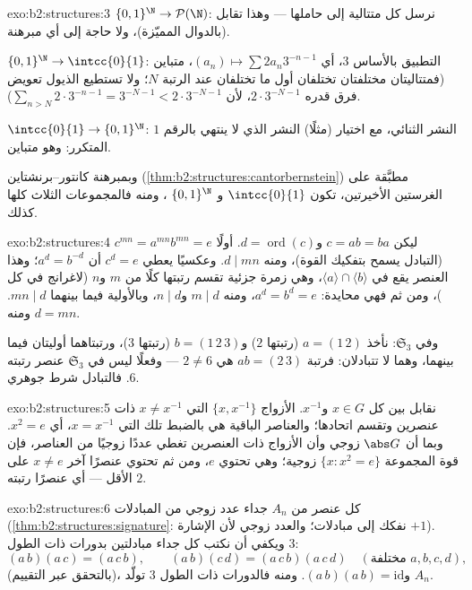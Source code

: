 \begin{solution}{exo:b2:structures:3}
$\{0,1\}^{\N} \to \mathcal{P}(\N)$: نرسل كل متتالية إلى حاملها
--- وهذا تقابل (بالدوال المميّزة)، ولا حاجة إلى أي مبرهنة.

$\{0,1\}^{\N} \to \intcc{0}{1}$: التطبيق بالأساس $3$، أي $(a_n) \mapsto
\sum 2a_n 3^{-n-1}$، متباين (فمتتاليتان مختلفتان تختلفان
أول ما تختلفان عند الرتبة $N$؛ ولا تستطيع الذيول تعويض فرق قدره $2\cdot
3^{-N-1}$، لأن $\sum_{n > N} 2\cdot 3^{-n-1} = 3^{-N-1} <
2\cdot3^{-N-1}$).

$\intcc{0}{1} \to \{0,1\}^{\N}$: النشر الثنائي، مع اختيار (مثلًا)
النشر الذي لا ينتهي بالرقم $1$ المتكرر: وهو متباين.

وبمبرهنة كانتور--برنشتاين (\cref{thm:b2:structures:cantorbernstein})
مطبَّقة على الغرستين الأخيرتين، تكون $\intcc{0}{1}$ و
$\{0,1\}^{\N}$ ، ومنه فالمجموعات الثلاث كلها كذلك.
\end{solution}

\begin{solution}{exo:b2:structures:4}
ليكن $c = ab = ba$ و$d = \operatorname{ord}(c)$. أولًا $c^{mn} =
a^{mn} b^{mn} = e$ (التبادل يسمح بتفكيك القوة)، ومنه $d
\mid mn$. وعكسيًا يعطي $c^d = e$ أن $a^d = b^{-d}$؛ وهذا العنصر
يقع في $\langle a\rangle \cap \langle b\rangle$، وهي زمرة جزئية تقسم
رتبتها كلًا من $m$ و$n$ (لاغرانج في كل )،
ومن ثم فهي محايدة: $a^d = b^d = e$، ومنه $m \mid d$ و$n \mid d$،
وبالأولية فيما بينهما $mn \mid d$. ومنه $d = mn$.

وفي $\mathfrak{S}_3$: نأخذ $a = (1\,2)$ (رتبتها $2$) و$b =
(1\,2\,3)$ (رتبتها $3$)، ورتبتاهما أوليتان فيما بينهما، وهما لا تتبادلان: فرتبة $ab =
(2\,3)$ هي $2 \neq 6$ --- وفعلًا ليس في $\mathfrak{S}_3$
عنصر رتبته $6$. فالتبادل شرط جوهري.
\end{solution}

\begin{solution}{exo:b2:structures:5}
نقابل بين كل $x \in G$ و$x^{-1}$. الأزواج $\{x, x^{-1}\}$ التي
$x \neq x^{-1}$ ذات عنصرين وتقسم اتحادها؛ والعناصر
الباقية هي بالضبط تلك التي $x = x^{-1}$، أي $x^2 =
e$. وبما أن $\abs G$ زوجي وأن الأزواج ذات العنصرين تغطي عددًا
زوجيًا من العناصر، فإن قوة المجموعة $\{x : x^2 = e\}$ زوجية؛
وهي تحتوي $e$، ومن ثم تحتوي عنصرًا آخر $x \neq
e$ على الأقل --- أي عنصرًا رتبته $2$.
\end{solution}

\begin{solution}{exo:b2:structures:6}
كل عنصر من $A_n$ جداء عدد زوجي من
المبادلات (\cref{thm:b2:structures:signature}: نفكك إلى
مبادلات؛ والعدد زوجي لأن الإشارة $+1$). ويكفي
أن نكتب كل جداء مبادلتين بدورات ذات الطول $3$:
\[
(a\,b)(a\,c) = (a\,c\,b),
\qquad
(a\,b)(c\,d) = (a\,c\,b)(a\,c\,d) \quad (\text{مختلفة } a,b,c,d),
\]
(بالتحقق عبر التقييم)، و$(a\,b)(a\,b) = \mathrm{id}$. ومنه فالدورات
ذات الطول $3$ تولّد $A_n$.
\end{solution}

